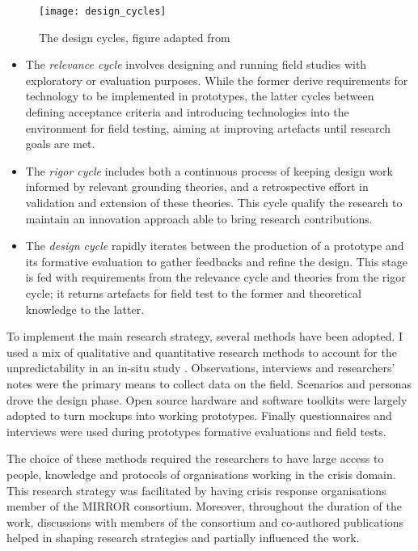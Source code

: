 \begin{figure}[tbh]
    \centering
    \texttt{[image: design\_cycles]}
    \caption{The design cycles, figure adapted from \protect\cite{hevner2007three}}
    \label{fig:design-cycles}
\end{figure}

\begin{itemize}
\item
  The \emph{relevance cycle} involves designing and running field
  studies with exploratory or evaluation purposes. While the former
  derive requirements for technology to be implemented in prototypes,
  the latter cycles between defining acceptance criteria and introducing
  technologies into the environment for field testing, aiming at
  improving artefacts until research goals are met.
\item
  The \emph{rigor cycle} includes both a continuous process of keeping
  design work informed by relevant grounding theories, and a
  retrospective effort in validation and extension of these theories.
  This cycle qualify the research to maintain an innovation approach
  able to bring research contributions.
\item
  The \emph{design cycle} rapidly iterates between the production of a
  prototype and its formative evaluation to gather feedbacks and refine
  the design. This stage is fed with requirements from the relevance
  cycle and theories from the rigor cycle; it returns artefacts for
  field test to the former and theoretical knowledge to the latter.
\end{itemize}

To implement the main research strategy, several methods have been
adopted. I used a mix of qualitative and quantitative research methods
to account for the unpredictability in an in-situ study
\autocite{Rogers:2007gv}. Observations, interviews and researchers'
notes were the primary means to collect data on the field. Scenarios and
personas drove the design phase. Open source hardware and software
toolkits were largely adopted to turn mockups into working prototypes.
Finally questionnaires and interviews were used during prototypes
formative evaluations and field tests.

The choice of these methods required the researchers to have large
access to people, knowledge and protocols of organisations working in
the crisis domain. This research strategy was facilitated by having
crisis response organisations member of the MIRROR consortium. Moreover,
throughout the duration of the work, discussions with members of the
consortium and co-authored publications helped in shaping research
strategies and partially influenced the work.

